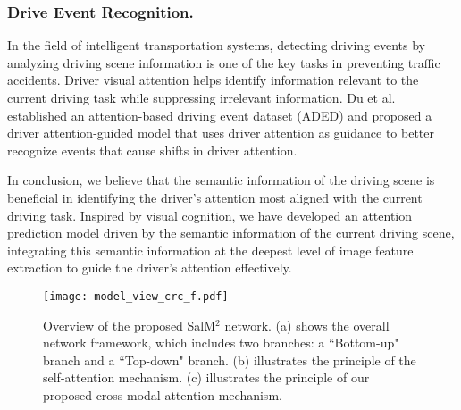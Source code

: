 \subsubsection{Drive Event Recognition.} In the field of intelligent transportation systems, detecting driving events by analyzing driving scene information is one of the key tasks in preventing traffic accidents. Driver visual attention helps identify information relevant to the current driving task while suppressing irrelevant information. Du et al. \cite{du2023causes} established an attention-based driving event dataset (ADED) and proposed a driver attention-guided model that uses driver attention as guidance to better recognize events that cause shifts in driver attention.

In conclusion, we believe that the semantic information of the driving scene is beneficial in identifying the driver’s attention most aligned with the current driving task. Inspired by visual cognition, we have developed an attention prediction model driven by the semantic information of the current driving scene, integrating this semantic information at the deepest level of image feature extraction to guide the driver's attention effectively.
\begin{figure*}
    \centering
    \texttt{[image: model\_view\_crc\_f.pdf]}
    \caption{Overview of the proposed SalM$^2$ network. (a) shows the overall network framework, which includes two branches: a ``Bottom-up" branch and a ``Top-down" branch. (b) illustrates the principle of the self-attention mechanism. (c) illustrates the principle of our proposed cross-modal attention mechanism.}
    \label{fig:model_overview}
\end{figure*}